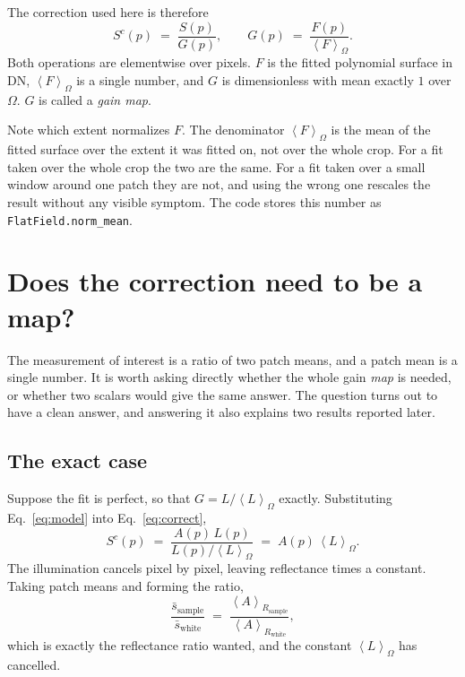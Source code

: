 \documentclass[11pt, a4paper]{article}
\newcommand{\code}[1]{\texttt{#1}}
\newcommand{\mean}[2]{\left\langle #1 \right\rangle_{#2}}
\begin{document}
The correction used here is therefore
\begin{equation}
  S^{c}(p)
  \;=\;
  \frac{S(p)}{G(p)},
  \qquad
  G(p) \;=\; \frac{F(p)}{\mean{F}{\Omega}} .
  \label{eq:correct}
\end{equation}
Both operations are elementwise over pixels.
$F$ is the fitted polynomial surface in DN,
$\mean{F}{\Omega}$ is a single number,
and $G$ is dimensionless with mean exactly $1$ over $\Omega$.
$G$ is called a \emph{gain map}.

Note which extent normalizes $F$.
The denominator $\mean{F}{\Omega}$ is the mean of the fitted surface
over the extent it was fitted on,
not over the whole crop.
For a fit taken over the whole crop the two are the same.
For a fit taken over a small window around one patch they are not,
and using the wrong one rescales the result without any visible symptom.
The code stores this number as \code{FlatField.norm\_mean}.

\section{Does the correction need to be a map?}
\label{sec:scalar}

The measurement of interest is a ratio of two patch means,
and a patch mean is a single number.
It is worth asking directly whether the whole gain \emph{map} is needed,
or whether two scalars would give the same answer.
The question turns out to have a clean answer,
and answering it also explains two results reported later.

\subsection{The exact case}

Suppose the fit is perfect,
so that $G = L / \mean{L}{\Omega}$ exactly.
Substituting Eq.~\ref{eq:model} into Eq.~\ref{eq:correct},
\begin{equation}
  S^{c}(p) \;=\; \frac{A(p)\,L(p)}{L(p)/\mean{L}{\Omega}}
             \;=\; A(p)\,\mean{L}{\Omega} .
\end{equation}
The illumination cancels pixel by pixel,
leaving reflectance times a constant.
Taking patch means and forming the ratio,
\begin{equation}
  \frac{\bar{s}_{\mathrm{sample}}}{\bar{s}_{\mathrm{white}}}
  \;=\;
  \frac{\mean{A}{R_{\mathrm{sample}}}}{\mean{A}{R_{\mathrm{white}}}} ,
\end{equation}
which is exactly the reflectance ratio wanted,
and the constant $\mean{L}{\Omega}$ has cancelled.
\end{document}
